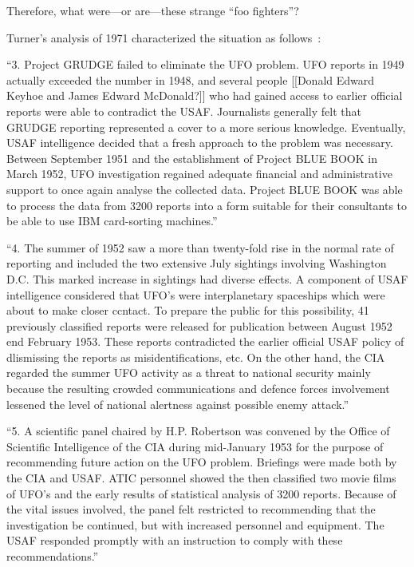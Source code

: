 Therefore, what were---or are---these strange ``foo fighters''?

Turner's analysis of 1971 characterized the situation as follows~\cite{TurnerAustralia1971}:
\begin{svgraybox}
``3. Project GRUDGE failed to eliminate the UFO problem. UFO
reports in 1949 actually exceeded the number in 1948, and several
people [[Donald Edward Keyhoe and James Edward McDonald?]]
who had gained access to earlier official reports were able
to contradict the USAF. Journalists generally felt that GRUDGE
reporting represented a cover to a more serious knowledge. Eventually,
USAF intelligence decided that a fresh approach to the problem was
necessary. Between September 1951 and the establishment of Project
BLUE BOOK in March 1952, UFO investigation regained adequate financial
and administrative support to once again analyse the collected data.
Project BLUE BOOK was able to process the data from 3200 reports into
a form suitable for their consultants to be able to use
IBM card-sorting machines.''

``4. The summer of 1952 saw a more than twenty-fold rise in
the normal rate of reporting and included the two extensive July
sightings involving Washington D.C. This marked increase in sightings
had diverse effects. A component of USAF intelligence considered
that UFO's were interplanetary spaceships which were about to make
closer ccntact. To prepare the public for this possibility, 41
previously classified reports were released for publication between
August 1952 end February 1953. These reports contradicted the
earlier official USAF policy of dlismissing the reports as
misidentifications, etc. On the other hand, the CIA regarded
the summer
UFO activity as a threat to national security mainly because the
resulting crowded communications and defence forces involvement
lessened the level of national alertness against possible enemy attack.''

``5. A scientific panel chaired by H.P. Robertson was convened by
the Office of Scientific Intelligence of the CIA during mid-January 1953
for the purpose of recommending future action on the UFO problem.
Briefings were made both by the CIA and USAF. ATIC personnel showed the
then classified two movie films of UFO's and the early results of
statistical analysis of 3200 reports. Because of the vital issues
involved, the panel felt restricted to recommending that the
investigation be continued, but with increased personnel and equipment.
The USAF responded promptly with an instruction to comply with these
recommendations.''


\end{svgraybox}
